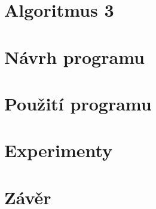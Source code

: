 \chapter{Algoritmus 3}
    \label{chapter:Algo3}
    \lipsum

\chapter{Návrh programu}
    \label{chapter:Design}
    \lipsum

\chapter{Použití programu}
    \label{chapter:Help}
    \lipsum

\chapter{Experimenty}
    \label{chapter:Experiments}
    \lipsum

\chapter{Závěr}
    \label{chapter:Conclusion}
    \lipsum[2]
